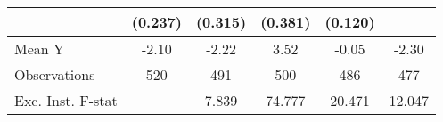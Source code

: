 {\begin{tabular}{l*{5}{c}}
            &     (0.237)         &     (0.315)         &     (0.381)         &     (0.120)         &                     \\
\midrule
Mean Y      &       -2.10         &       -2.22         &        3.52         &       -0.05         &       -2.30         \\
Observations&         520         &         491         &         500         &         486         &         477         \\
Exc. Inst. F-stat&                     &       7.839         &      74.777         &      20.471         &      12.047         \\
\bottomrule
\end{tabular}
}

